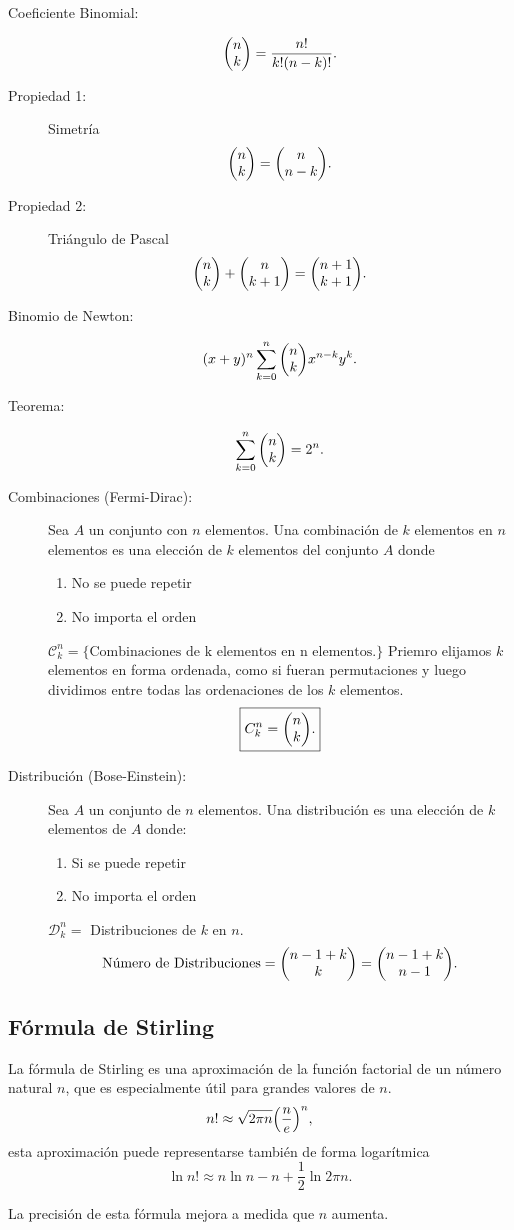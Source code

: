 \begin{description}
    \item[Coeficiente Binomial: ] 
        $$ \mqty(n \\ k) = \frac{n!}{k! (n - k)!}. $$
    \item[Propiedad 1: ] Simetría
        $$ \mqty(n \\ k) = \mqty(n \\ n - k). $$
    \item[Propiedad 2: ] Triángulo de Pascal
        $$ \mqty(n \\ k) + \mqty(n \\ k + 1) = \mqty(n + 1 \\ k + 1). $$
    \item[Binomio de Newton: ] 
        $$ (x + y)^n \sum _{k=0} ^n \mqty(n \\ k) x^{n - k} y^k . $$
    \item[Teorema: ] 
        $$ \sum _{k=0}  ^n \mqty(n \\ k) = 2^n . $$
    \item[Combinaciones (Fermi-Dirac): ] Sea $A$ un conjunto con $n$ elementos. Una combinación de $k$ elementos en $n$ elementos es una elección de $k$ elementos del conjunto $A$ donde
    \begin{enumerate}
        \item No se puede repetir
        \item No importa el orden
    \end{enumerate}
    $\mathcal{C} _k ^n = \{ \text{Combinaciones de k elementos en n elementos}. \}$ Priemro elijamos $k$ elementos en forma ordenada, como si fueran permutaciones y luego dividimos entre todas las ordenaciones de los $k$ elementos.
        $$ \boxed{ C_k ^n = \mqty(n \\ k). } $$
    \item[Distribución (Bose-Einstein): ] Sea $A$ un conjunto de $n$ elementos. Una distribución es una elección de $k$ elementos de $A$ donde:
    \begin{enumerate}
        \item Si se puede repetir
        \item No importa el orden
    \end{enumerate}
    $\mathcal{D} _k ^n = $ Distribuciones de $k$ en $n$.
        $$ \text{Número de Distribuciones} = \mqty(n - 1 + k \\ k) = \mqty(n - 1 + k \\ n - 1). $$
\end{description}

\subsection{Fórmula de Stirling}
La fórmula de Stirling es una aproximación de la función factorial de un número natural $n$, que es especialmente útil para grandes valores de $n$.
    $$ n! \approx \sqrt{2\pi n} \qty(\frac{n}{e})^n, $$
esta aproximación puede representarse también de forma logarítmica
    $$ \ln{n!} \approx n\ln{n} - n + \frac{1}{2} \ln{2\pi n}. $$

La precisión de esta fórmula mejora a medida que $n$ aumenta.
